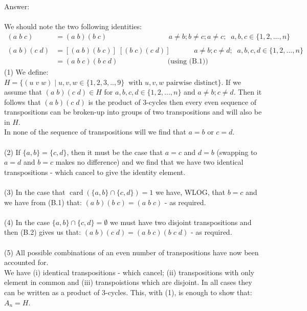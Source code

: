 \documentclass[12pt,a4paper]{article}
\begin{document}
\vspace{1cm}
\noindent
Answer:\\
\\
We should note the two following identities:
\begin{align*}
  (a \; b \; c) &= (a \; b)(b \; c) \;\;\;\;\;\;\;\;\;\;\;\;\;\;\;\;\;\;\;\;\;\;\;\;\;\;\;\;\;\;\; a \ne b; b \ne c; a \ne c; \;\; a,b,c \in \{1,2,...,n\} \tag{B.1}  \\
  \\
  (a \; b)(c \; d) &= [(a \; b)(b \; c)]\;[(b \; c)(c \; d)] \;\;\;\;\;\;\;\;\;\;\;\; a \ne b; c \ne d; \;\; a,b,c,d \in \{1,2,...,n\}  \\
  &= (a \; b \; c)(b \; c \; d) \;\;\;\;\;\;\;\;\;\;\;\;\;\;\;\;\;\;\;\;\;\;\;\;\; \text{(using (B.1))} \tag{B.2}
\end{align*}
(1) We define: $H = \{(u \; v \; w) \mid u,v,w \in \{1,2,3,..,9\} \;\; \text{with $u,v,w$ pairwise distinct} \}$.  If we assume that $(a \; b)(c \; d) \in H$ for $a,b,c,d \in \{1,2,...,n\}$ and
$a \ne b; c \ne d$.  Then it follows that $(a \; b)(c \; d)$ is the product of 3-cycles then every even sequence of transpositions can be broken-up into groups of two transpositions and will also be in $H$.\\
In none of the sequence of transpositions will we find that $a=b$ or $c=d$.\\
\\
(2) If $\{a,b\} = \{c,d\}$, then it must be the case that $a=c$ and $d=b$ (swapping to $a=d$ and $b=c$ makes no difference) and we find that we
have two identical transpositions - which cancel to give the identity element.\\
\\
(3) In the case that $\operatorname{card}(\{a,b\}\cap\{c,d\})=1$ we have, WLOG, that $b=c$ and we have from (B.1) that: $(a \; b)(b \; c) = (a \; b \; c)$ - as required.\\
\\
(4) In the case $\{a,b\}\cap\{c,d\}=\emptyset$ we must have two disjoint transpositions and then (B.2) gives us that:
$(a \; b)(c \; d) = (a \; b \; c)(b \; c \; d)$ - as required.\\
\\
(5) All possible combinations of an even number of transpositions have now been accounted for.\\
We have (i) identical transpositions - which cancel; (ii) transpositions with only element in common and (iii) transpoistions which are disjoint.  In all cases they can be written as 
a product of 3-cycles.  This, with (1), is enough to show that: $A_n = H$.
\end{document}
